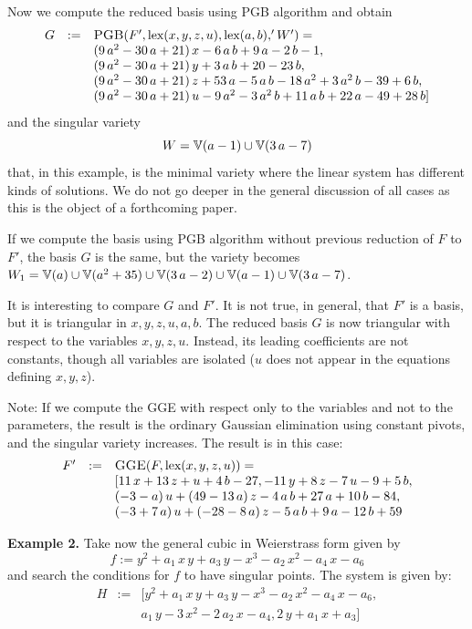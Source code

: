 Now we compute the reduced \Gr basis using {\sc PGB} algorithm and
obtain
\[
\begin{array}{lll}
G &:=& \hbox{\sc PGB}(F',\hbox{lex}(x,y,z,u),\hbox{lex}(a,b),'W')
=
\\ && (9\,a^2-30\,a+21)\,x-6\,a\,b+9\,a-2\,b-1, \\
&&(9\,a^2-30\,a+21)\,y+3\,a\,b+20-23\,b, \\
&&(9\,a^2-30\,a+21)\,z+53\,a-5\,a\,b-18\,a^2+3\,a^2\,b-39+6\,b,\\
&& (9\,a^2-30\,a+21)\,u-9\,a^2-3\,a^2\,b+11\,a\,b+22\,a-49+28\,b]
 \\
\end{array}
\]
and the singular variety
\[W={\mathbb{V}}(a-1) \cup {\mathbb{V}}( 3\,a-7) \]
that, in this example, is the minimal variety where the linear
system has different kinds of solutions.
We do not go deeper in the general discussion of all cases
as this is the object of a forthcoming paper.


If we compute the \Gr basis using {\sc PGB} algorithm without
previous reduction of $F$ to $F'$, the basis $G$ is the same, but
the variety becomes $W_1={\mathbb{V}}(a) \cup {\mathbb{V}}(a^2+35) \cup
{\mathbb{V}}(3\,a-2) \cup {\mathbb{V}}(a-1) \cup {\mathbb{V}}( 3\,a-7)$.

It is interesting to compare $G$ and $F'$. It is not true, in
general, that $F'$ is a \Gr basis, but it is triangular in
$x,y,z,u,a,b$. The reduced \Gr basis $G$ is now triangular with
respect to the variables $x,y,z,u$. Instead, its leading
coefficients are not constants, though all variables are isolated
($u$ does not appear in the equations defining $x,y,z$).

Note: If we compute the {\sc GGE} with respect only to the
variables and not to the parameters, the result is the ordinary
Gaussian elimination using constant pivots, and the singular
variety increases. The result is in this case:
\[
\begin{array}{lcl}
F' &:=& \hbox{\sc GGE}(F,\hbox{lex}(x,y,z,u)) = \\ &&[11\,x +
13\,z + u + 4\,b - 27, -11\,y + 8\,z - 7\,u - 9 + 5\,b, \\ &&(-3 -
a)\,u + (49 - 13\,a)\,z - 4\,a\,b + 27\,a + 10\,b   -84, \\ &&(-3
+ 7\,a)\,u + (-28 - 8\,a)\,z - 5\,a\,b + 9\,a- 12\,b   +59 \\
\end{array}
\]

{\bf Example 2.} Take now the general cubic in Weierstrass form
given by
\[f:=y^2+a_1\,x\,y+a_3\,y-x^3-a_2\,x^2-a_4\,x-a_6\]
and search the conditions for $f$ to have singular points.
The system is given by:
\[
\begin{array}{lll}
H &:=& [y^2+a_1\,x\,y+a_3\,y-x^3-a_2\,x^2-a_4\,x-a_6, \\
&& a_1\,y-3\,x^2-2\,a_2\,x-a_4, 2\,y+a_1\,x+a_3] \\
\end{array}
\]

